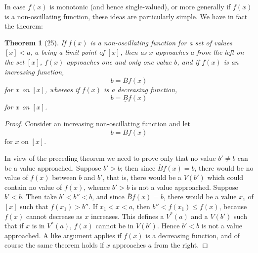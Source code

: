 \documentclass[a4paper,12pt]{book}[2004/02/16]
\providecommand{\leqq}{\leq}
\providecommand{\hypertarget}[2]{#2}
\theoremstyle{ilemma}
\theoremstyle{itheorem}
\newtheorem{theorem}{Theorem}
\theoremstyle{iother}
\theoremstyle{icorollary}
\theoremstyle{numcorollary}
\theoremstyle{idefinition}
\begin{document}
In case $f(x)$ is monotonic (and hence single-valued), or more
generally if $f(x)$ is a non-oscillating function, these ideas are
particularly simple. We have in fact the theorem:

\begin{theorem}[25]\hypertarget{thm25}{}
If $f(x)$ is a non-oscillating function for a set of values $[x] < a$,
$a$ being a limit point of $[x]$, then as $x$ approaches $a$
from the left on the set $[x]$, $f(x)$ approaches one and only one
value $b$, and if $f(x)$ is an increasing function,
\[
  b=\overline{B}f(x)
\]
for $x$ on $[x]$, whereas if $f(x)$ is a decreasing function,
\[
  b=\underline{B}f(x)
\]
for $x$ on $[x]$.
\end{theorem}

\begin{proof}
Consider an increasing non-oscillating function and let
\[
  b=\overline{B}f(x)
\]
for $x$ on $[x]$.

In view of the preceding theorem we need to prove only that no value
$b'\neq b$ can be a value approached. Suppose $b'>b$; then since
$\overline{B}f(x) =b$, there would be no value of $f(x)$ between $b$
and $b'$, that is, there would be a $V(b')$ which could contain no
value of $f(x)$, whence $b'>b$ is not a value approached. Suppose
$b'<b$. Then take $b'<b''<b$, and since $\overline{B}f(x)=b$, there
would be a value $x_1$ of $[x]$ such that $f(x_1)>b''$. If $x_1<x<a$,
then $b''<f(x_1)\leqq f(x)$, because $f(x)$ cannot decrease as $x$
increases.  This defines a $V^*(a)$ and a $V(b')$ such that if $x$ is
in $V^*(a)$, $f(x)$ cannot be in $V(b')$. Hence $b'<b$ is not a value
approached. A like argument applies if $f(x)$ is a decreasing
function, and of course the same theorem holds if $x$ approaches $a$
from the right.
\end{proof}
\end{document}
